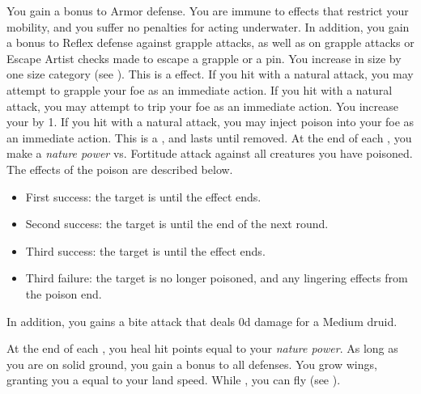         You gain a  bonus to Armor defense.
         You are immune to effects that restrict your mobility, and you suffer no penalties for acting underwater.
        In addition, you gain a  bonus to Reflex defense against grapple attacks, as well as on grapple attacks or Escape Artist checks made to escape a grapple or a pin.
        You increase in size by one size category (see ).
        This is a  effect.
        If you hit with a natural attack, you may attempt to grapple your foe as an immediate action.
        If you hit with a natural attack, you may attempt to trip your foe as an immediate action.
        You increase your  by 1.
        If you hit with a natural attack, you may inject poison into your foe as an immediate action.
        This is a , and lasts until removed.
        At the end of each , you make a \textit{nature power} vs. Fortitude attack against all creatures you have poisoned.
        The effects of the poison are described below.
        \begin{itemize}
            \item First success: the target is \sickened until the effect ends.
            \item Second success: the target is \staggered until the end of the next round.
            \item Third success: the target is \nauseated until the effect ends.
            \item Third failure: the target is no longer poisoned, and any lingering effects from the poison end.
        \end{itemize}
        \par In addition, you gains a bite attack that deals \plus0d damage for a Medium druid.

        At the end of each , you heal hit points equal to your \textit{nature power}.
         As long as you are on solid ground, you gain a  bonus to all defenses.
        You grow wings, granting you a  equal to your land speed.
        While , you can fly (see ).

